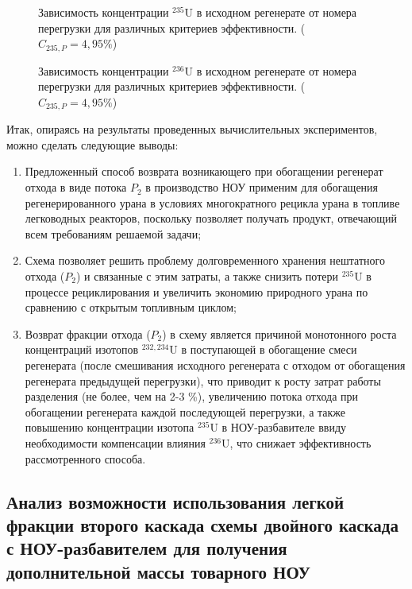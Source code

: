 \begin{figure}[h]
    \centering
    \begin{minipage}{.5\textwidth}
      \centering
      
      \caption{{Зависимость концентрации $^{235}$U в исходном регенерате от номера перегрузки для различных критериев эффективности. ($C_{235,{P}}=4,95\%$){\label{10}}}}
    \end{minipage}%
    \begin{minipage}{.5\textwidth}
      \centering
      
\caption{{Зависимость концентрации $^{236}$U в исходном регенерате от номера перегрузки для различных критериев эффективности. ($C_{235,{P}}=4,95\%$){\label{11}}}}
\end{minipage}
\end{figure}

\newpage

Итак, опираясь на результаты проведенных вычислительных экспериментов, можно сделать следующие выводы:

\begin{enumerate}
    \item Предложенный способ возврата возникающего при обогащении регенерат отхода в виде потока $P_2$ в производство НОУ применим для обогащения регенерированного урана в условиях многократного рецикла урана в топливе легководных реакторов, поскольку позволяет получать продукт, отвечающий всем требованиям решаемой задачи;
    \item Схема позволяет решить проблему долговременного хранения нештатного отхода ($P_2$) и связанные с этим затраты, а также снизить потери $^{235}$U в процессе рециклирования и увеличить экономию природного урана по сравнению с открытым топливным циклом;
    \item Возврат фракции отхода ($P_2$) в схему является причиной монотонного роста концентраций изотопов $^{232,234}$U в поступающей в обогащение смеси регенерата (после смешивания исходного регенерата с отходом от обогащения регенерата предыдущей перегрузки), что приводит к росту затрат работы разделения (не более, чем на 2-3 \%), увеличению потока отхода при обогащении регенерата каждой последующей перегрузки, а также повышению концентрации изотопа $^{235}$U в НОУ-разбавителе ввиду необходимости компенсации влияния $^{236}$U, что снижает эффективность рассмотренного способа.
\end{enumerate}


\subsection{Анализ возможности использования легкой фракции второго каскада схемы двойного каскада с НОУ-разбавителем для получения дополнительной массы товарного НОУ}\label{indep_p2}

